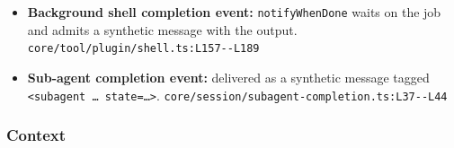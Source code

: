 \begin{itemize}
\item \textbf{Background shell completion event:} \texttt{notifyWhenDone} waits on the job and admits a synthetic message with the output. \texttt{core/\allowbreak{}tool/\allowbreak{}plugin/\allowbreak{}shell.\allowbreak{}ts:\allowbreak{}L157-\allowbreak{}-\allowbreak{}L189}
\item \textbf{Sub-agent completion event:} delivered as a synthetic message tagged \texttt{<subagent \ldots{} state=\ldots{}>}. \texttt{core/\allowbreak{}session/\allowbreak{}subagent-\allowbreak{}completion.\allowbreak{}ts:\allowbreak{}L37-\allowbreak{}-\allowbreak{}L44}
\end{itemize}

\subsubsection*{Context}
